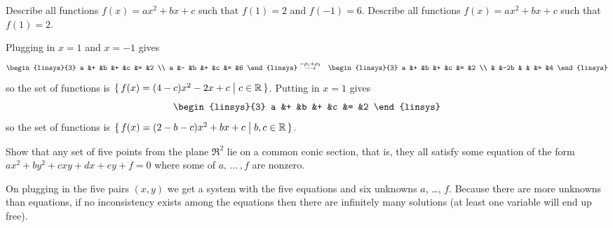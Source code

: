 \begin{exercises}
\begin{exparts}
      \partsitem Describe all functions \( f(x)=ax^2+bx+c \) 
        such that \( f(1)=2 \) and \( f(-1)=6 \).
      \partsitem Describe all functions \( f(x)=ax^2+bx+c \) 
        such that \( f(1)=2 \).
    \end{exparts}
    \begin{answer}
      \begin{exparts}
        \partsitem Plugging in \( x=1 \) and \( x=-1 \) gives
          \begin{eqnarray*}
            \begin{linsys}{3}
              a  &+  &b   &+  &c  &=  &2  \\
              a  &-  &b   &+  &c  &=  &6  
            \end{linsys}
            &\grstep{-\rho_1+\rho_2}
            &\begin{linsys}{3}
              a  &+  &b   &+  &c  &=  &2  \\
                 &   &-2b &   &   &=  &4  
              \end{linsys}
          \end{eqnarray*}
          so the set of functions is
          \( \mbox{$\{\,f(x)=(4-c)x^2-2x+c\bigm| c\in\mathbb{R}\,\}$} \).
        \partsitem Putting in \( x=1 \) gives
          \begin{equation*}
            \begin{linsys}{3}
              a  &+  &b   &+  &c  &=  &2  
            \end{linsys}
          \end{equation*}
          so the set of functions is
          \( \mbox{$\{\,f(x)=(2-b-c)x^2+bx+c\bigm| b,c\in\mathbb{R}\,\}$} \).
      \end{exparts}  
    \end{answer}
  \item Show that any set of five points from the plane \( \Re^2 \) lie on a
    common conic section, that is, they all satisfy some equation of the
    form \( ax^2+by^2+cxy+dx+ey+f=0 \) where some of \( a,\,\ldots\,,f \)
    are nonzero.
    \begin{answer}
      On plugging in the five pairs $(x,y)$ we get a system with the
      five equations and six unknowns $a$, \ldots, $f$.
      Because there are more unknowns than equations, if no inconsistency
      exists among the equations then there are infinitely many solutions
      (at least one variable will end up free).


\end{answer}
\end{exercises}
